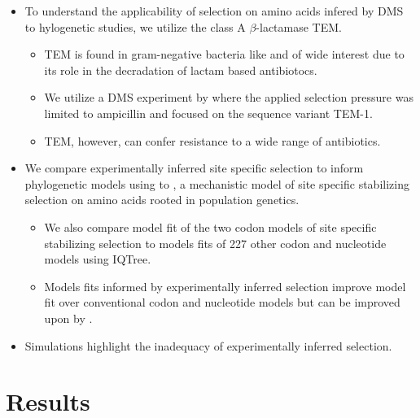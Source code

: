 \documentclass[12pt]{article}
\begin{document}
\begin{itemize}
\begin{itemize}
	\end{itemize}
	\item To understand the applicability of selection on amino acids infered by DMS to hylogenetic studies, we utilize the class A $\beta$-lactamase TEM.
	\begin{itemize}
		\item TEM is found in gram-negative bacteria like \ecoli and of wide interest due to its role in the decradation of lactam based antibiotocs.
		\item We utilize a DMS experiment by \citep{stiffler2016} where the applied selection pressure was limited to ampicillin and focused on the sequence variant TEM-1.
		\item TEM, however, can confer resistance to a wide range of antibiotics.
	\end{itemize}
	\item We compare experimentally inferred site specific selection to inform phylogenetic models using \phydms to \selac, a mechanistic model of site specific stabilizing selection on amino acids rooted in population genetics.
	\begin{itemize}
		\item We also compare model fit of the two codon models of site specific stabilizing selection to models fits of 227 other codon and nucleotide models using IQTree.
		\item Models fits informed by experimentally inferred selection improve model fit over conventional codon and nucleotide models but can be improved upon by \selac.
	\end{itemize}
	\item Simulations highlight the inadequacy of experimentally inferred selection.
	
\end{itemize}

\section*{Results}
\end{document}

